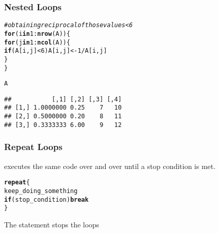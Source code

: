 \documentclass[12pt]{beamer}\usepackage[]{graphicx}\usepackage[]{color}
\makeatletter
\newcommand{\hlnum}[1]{\textcolor[rgb]{0.686,0.059,0.569}{#1}}%
\newcommand{\hlcom}[1]{\textcolor[rgb]{0.678,0.584,0.686}{\textit{#1}}}%
\newcommand{\hlopt}[1]{\textcolor[rgb]{0,0,0}{#1}}%
\newcommand{\hlstd}[1]{\textcolor[rgb]{0.345,0.345,0.345}{#1}}%
\newcommand{\hlkwa}[1]{\textcolor[rgb]{0.161,0.373,0.58}{\textbf{#1}}}%
\newcommand{\hlkwb}[1]{\textcolor[rgb]{0.69,0.353,0.396}{#1}}%
\newcommand{\hlkwd}[1]{\textcolor[rgb]{0.737,0.353,0.396}{\textbf{#1}}}%
\newenvironment{kframe}{%
 \def\at@end@of@kframe{}%
 \ifinner\ifhmode%
  \def\at@end@of@kframe{\end{minipage}}%
  \begin{minipage}{\columnwidth}%
 \fi\fi%
 \def\FrameCommand##1{\hskip\@totalleftmargin \hskip-\fboxsep
 \colorbox{shadecolor}{##1}\hskip-\fboxsep
     \hskip-\linewidth \hskip-\@totalleftmargin \hskip\columnwidth}%
 \MakeFramed {\advance\hsize-\width
   \@totalleftmargin\z@ \linewidth\hsize
   \@setminipage}}%
 {\par\unskip\endMakeFramed%
 \at@end@of@kframe}
\newenvironment{knitrout}{}{} %
\makeatother
\begin{document}
\begin{frame}[fragile]
\frametitle{Nested Loops}
\begin{knitrout}\footnotesize
{}\color{fgcolor}\begin{kframe}
\begin{alltt}
\hlcom{# obtaining reciprocal of those values < 6}
\hlkwa{for} \hlstd{(i} \hlkwa{in} \hlnum{1}\hlopt{:}\hlkwd{nrow}\hlstd{(A)) \{}
  \hlkwa{for} \hlstd{(j} \hlkwa{in} \hlnum{1}\hlopt{:}\hlkwd{ncol}\hlstd{(A)) \{}
    \hlkwa{if} \hlstd{(A[i,j]} \hlopt{<} \hlnum{6}\hlstd{) A[i,j]} \hlkwb{<-} \hlnum{1} \hlopt{/} \hlstd{A[i,j]}
  \hlstd{\}}
\hlstd{\}}

\hlstd{A}
\end{alltt}
\begin{verbatim}
##           [,1] [,2] [,3] [,4]
## [1,] 1.0000000 0.25    7   10
## [2,] 0.5000000 0.20    8   11
## [3,] 0.3333333 6.00    9   12
\end{verbatim}
\end{kframe}
\end{knitrout}

\end{frame}


\begin{frame}
\begin{center}
\Huge{}
\end{center}
\end{frame}


\begin{frame}[fragile]
\frametitle{Repeat Loops}

 executes the same code over and over until a stop condition is met.

\begin{knitrout}\footnotesize
{}\color{fgcolor}\begin{kframe}
\begin{alltt}
\hlkwa{repeat} \hlstd{\{}
  \hlstd{keep_doing_something}
  \hlkwa{if} \hlstd{(stop_condition)} \hlkwa{break}
\hlstd{\}}
\end{alltt}
\end{kframe}
\end{knitrout}

The  statement stops the loops

\end{frame}
\end{document}
